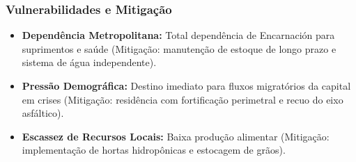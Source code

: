 \subsubsection{Vulnerabilidades e
Mitigação}

\begin{itemize}
\tightlist
\item
  \textbf{Dependência Metropolitana:} Total dependência de Encarnación
  para suprimentos e saúde (Mitigação: manutenção de estoque de longo
  prazo e sistema de água independente).
\item
  \textbf{Pressão Demográfica:} Destino imediato para fluxos migratórios
  da capital em crises (Mitigação: residência com fortificação
  perimetral e recuo do eixo asfáltico).
\item
  \textbf{Escassez de Recursos Locais:} Baixa produção alimentar
  (Mitigação: implementação de hortas hidropônicas e estocagem de
  grãos).
\end{itemize}

